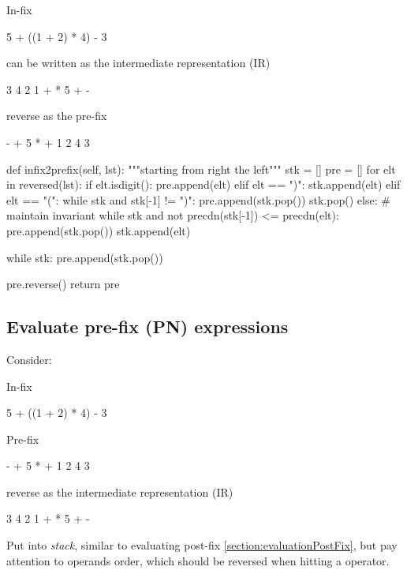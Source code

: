 In-fix
\begin{python}
5 + ((1 + 2) * 4) - 3
\end{python}

can be written as the intermediate representation (IR)
\begin{python}
3 4 2 1 + * 5 + -
\end{python}

reverse as the pre-fix
\begin{python}
- + 5 * + 1 2 4 3
\end{python}

\begin{python}
  def infix2prefix(self, lst):
    """starting from right the left"""
    stk = []
    pre = []
    for elt in reversed(lst):
      if elt.isdigit():
        pre.append(elt)
      elif elt == ")":
        stk.append(elt)
      elif elt == "(":
        while stk and stk[-1] != ")":
          pre.append(stk.pop())
        stk.pop()
      else:
        # maintain invariant
        while stk and not precdn(stk[-1]) <= precdn(elt):  
          pre.append(stk.pop())
        stk.append(elt)

    while stk:
      pre.append(stk.pop())

    pre.reverse()
    return pre
\end{python}


\subsection{Evaluate pre-fix (PN) expressions}
Consider: 

In-fix
\begin{python}
5 + ((1 + 2) * 4) - 3
\end{python}

Pre-fix
\begin{python}
- + 5 * + 1 2 4 3
\end{python}

reverse as the intermediate representation (IR)
\begin{python}
3 4 2 1 + * 5 + -
\end{python}
Put into \textit{stack}, similar to evaluating post-fix \ref{section:evaluationPostFix}, but pay attention to operands order, which should be reversed when hitting a operator. 
